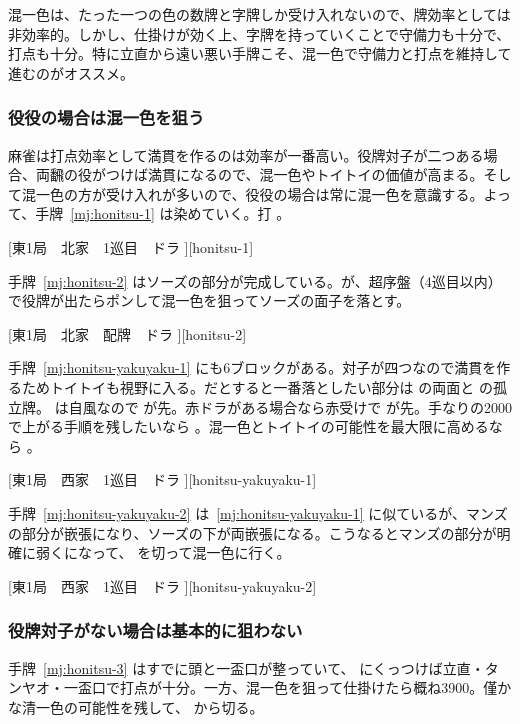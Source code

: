 \documentclass[../nankiru_main.tex]{subfiles}
\begin{document}
混一色は、たった一つの色の数牌と字牌しか受け入れないので、牌効率としては非効率的。しかし、仕掛けが効く上、字牌を持っていくことで守備力も十分で、打点も十分。特に立直から遠い悪い手牌こそ、混一色で守備力と打点を維持して進むのがオススメ。


\subsubsection*{役役の場合は混一色を狙う}

麻雀は打点効率として満貫を作るのは効率が一番高い。役牌対子が二つある場合、両飜の役がつけば満貫になるので、混一色やトイトイの価値が高まる。そして混一色の方が受け入れが多いので、役役の場合は常に混一色を意識する\citep[][pp.~96--97]{zero-teyaku}。よって、手牌~\ref{mj:honitsu-1} は染めていく。打 。

[東1局　北家　1巡目　ドラ ][honitsu-1]

手牌~\ref{mj:honitsu-2} はソーズの部分が完成している。が、超序盤（4巡目以内）で役牌が出たらポンして混一色を狙ってソーズの面子を落とす\citep[][p.~97]{zero-teyaku}。

[東1局　北家　配牌　ドラ ][honitsu-2]

手牌~\ref{mj:honitsu-yakuyaku-1} にも6ブロックがある。対子が四つなので満貫を作るためトイトイも視野に入る。だとすると一番落としたい部分は  の両面と  の孤立牌。 は自風なので  が先。赤ドラがある場合なら赤受けで  が先。手なりの2000で上がる手順を残したいなら 。混一色とトイトイの可能性を最大限に高めるなら  \citep[][pp.~98--103]{tetsusenryaku}。

[東1局　西家　1巡目　ドラ ][honitsu-yakuyaku-1]

手牌~\ref{mj:honitsu-yakuyaku-2} は~\ref{mj:honitsu-yakuyaku-1} に似ているが、マンズの部分が嵌張になり、ソーズの下が両嵌張になる。こうなるとマンズの部分が明確に弱くになって、 を切って混一色に行く\citep[][pp.~98--103]{tetsusenryaku}。

[東1局　西家　1巡目　ドラ ][honitsu-yakuyaku-2]


\subsubsection*{役牌対子がない場合は基本的に狙わない}

手牌~\ref{mj:honitsu-3} はすでに頭と一盃口が整っていて、 にくっつけば立直・タンヤオ・一盃口で打点が十分。一方、混一色を狙って仕掛けたら概ね3900。僅かな清一色の可能性を残して、 から切る\citep{shibukawa-honitsu}。
\end{document}
